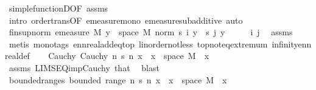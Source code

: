 \begin{isabellebody}
\ simple{\isacharunderscore}{\kern0pt}functionD{\isacharparenleft}{\kern0pt}{}{\isacharparenright}{\kern0pt}{\isacharbrackleft}{\kern0pt}OF\ assms{\isacharparenleft}{\kern0pt}{}{\isacharparenright}{\kern0pt}{\isacharbrackright}{\kern0pt}\ \isamarkupfalse%
\ {\isacharparenleft}{\kern0pt}intro\ order{\isacharunderscore}{\kern0pt}trans{\isacharbrackleft}{\kern0pt}OF\ emeasure{\isacharunderscore}{\kern0pt}mono\ emeasure{\isacharunderscore}{\kern0pt}subadditive{\isacharbrackright}{\kern0pt}{\isacharcomma}{\kern0pt}\ auto{\isacharparenright}{\kern0pt}\isanewline
\ \ \isamarkupfalse%
\ fin{\isacharunderscore}{\kern0pt}sup{\isacharunderscore}{\kern0pt}norm{\isacharcolon}{\kern0pt}\ {\isachardoublequoteopen}emeasure\ M\ {\isacharbraceleft}{\kern0pt}y\ {\isasymin}\ space\ M{\isachardot}{\kern0pt}\ norm\ {\isacharparenleft}{\kern0pt}s\ i\ y\ {\isacharminus}{\kern0pt}\ s\ j\ y{\isacharparenright}{\kern0pt}\ {\isasymnoteq}\ {}{\isacharbraceright}{\kern0pt}\ {\isasymnoteq}\ {\isasyminfinity}{\isachardoublequoteclose}\ \ i\ j\ \isamarkupfalse%
\ assms{\isacharparenleft}{\kern0pt}{}{\isacharparenright}{\kern0pt}\ \isamarkupfalse%
\ {\isacharparenleft}{\kern0pt}metis\ {\isacharparenleft}{\kern0pt}mono{\isacharunderscore}{\kern0pt}tags{\isacharparenright}{\kern0pt}\ ennreal{\isacharunderscore}{\kern0pt}add{\isacharunderscore}{\kern0pt}eq{\isacharunderscore}{\kern0pt}top\ linorder{\isacharunderscore}{\kern0pt}not{\isacharunderscore}{\kern0pt}less\ top{\isachardot}{\kern0pt}not{\isacharunderscore}{\kern0pt}eq{\isacharunderscore}{\kern0pt}extremum\ infinity{\isacharunderscore}{\kern0pt}ennreal{\isacharunderscore}{\kern0pt}def{\isacharparenright}{\kern0pt}\isanewline
\isanewline
\ \ \isamarkupfalse%
\ Cauchy{\isacharcolon}{\kern0pt}\ {\isachardoublequoteopen}Cauchy\ {\isacharparenleft}{\kern0pt}{\isasymlambda}n{\isachardot}{\kern0pt}\ s\ n\ x{\isacharparenright}{\kern0pt}{\isachardoublequoteclose}\ \ {\isachardoublequoteopen}x\ {\isasymin}\ space\ M{\isachardoublequoteclose}\ \ x\ \isamarkupfalse%
\ assms{\isacharparenleft}{\kern0pt}{}{\isacharparenright}{\kern0pt}\ LIMSEQ{\isacharunderscore}{\kern0pt}imp{\isacharunderscore}{\kern0pt}Cauchy\ that\ \isamarkupfalse%
\ blast\isanewline
\ \ \isamarkupfalse%
\ bounded{\isacharunderscore}{\kern0pt}range{\isacharunderscore}{\kern0pt}s{\isacharcolon}{\kern0pt}\ {\isachardoublequoteopen}bounded\ {\isacharparenleft}{\kern0pt}range\ {\isacharparenleft}{\kern0pt}{\isasymlambda}n{\isachardot}{\kern0pt}\ s\ n\ x{\isacharparenright}{\kern0pt}{\isacharparenright}{\kern0pt}{\isachardoublequoteclose}\ \ {\isachardoublequoteopen}x\ {\isasymin}\ space\ M{\isachardoublequoteclose}\ \ x\ \isamarkupfalse%

\end{isabellebody}
